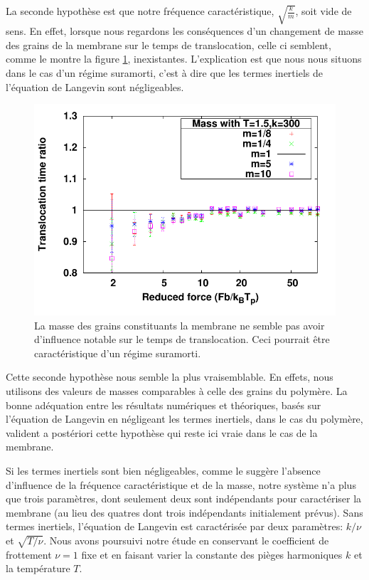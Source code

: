 La seconde hypothèse est que notre fréquence caractéristique, $\sqrt{\frac{k}{m}}$, soit vide de sens. En effet, lorsque nous regardons les conséquences d'un changement de masse des grains de la membrane sur le temps de translocation, celle ci semblent, comme le montre la figure \ref{influencemasse}, inexistantes. L'explication est que nous nous situons dans le cas d'un régime suramorti, c'est à dire que les termes inertiels de l'équation de Langevin sont négligeables.

\begin{figure}[H]
\begin{center}
\includegraphics[width=\textwidth]{compmt15.pdf} 

\caption[Influence de la masse]{La masse des grains constituants la membrane ne semble pas avoir d'influence notable sur le temps de translocation. Ceci pourrait être caractéristique d'un régime suramorti.}
\label{influencemasse}
\end{center}
\end{figure}

Cette seconde hypothèse nous semble la plus vraisemblable. En effets, nous utilisons des valeurs de masses comparables à celle des grains du polymère. La bonne adéquation entre les résultats numériques et théoriques, basés sur l'équation de Langevin en négligeant les termes inertiels, dans le cas du polymère, valident a postériori cette hypothèse qui reste ici vraie dans le cas de la membrane.

Si les termes inertiels sont bien négligeables, comme le suggère l'absence d'influence de la fréquence caractéristique et de la masse, notre système n'a plus que trois paramètres, dont seulement deux sont indépendants pour caractériser la membrane (au lieu des quatres dont trois indépendants initialement prévus). Sans termes inertiels, l'équation de Langevin est caractérisée par deux paramètres: $k/\nu$ et $\sqrt{T / \nu}$. Nous avons poursuivi notre étude en conservant le coefficient de frottement $\nu=1$ fixe et en faisant varier la constante des pièges harmoniques $k$ et la température $T$.


